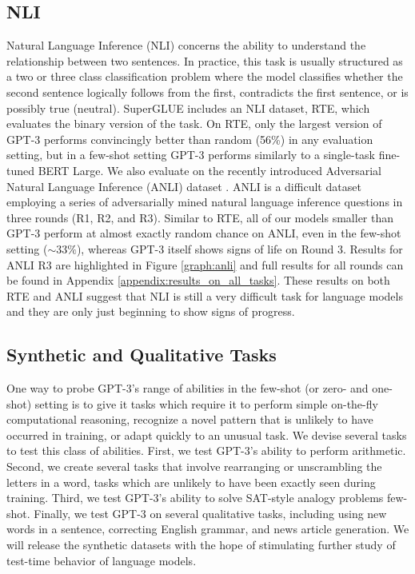 \documentclass{article}
\begin{document}
    \subsection{NLI}
    \label{section:ANLI}
Natural Language Inference (NLI) \cite{fyodorov2000natural} concerns the ability to understand the relationship between two sentences. In practice, this task is usually structured as a two or three class classification problem where the model classifies whether the second sentence logically follows from the first, contradicts the first sentence, or is possibly true (neutral). SuperGLUE includes an NLI dataset, RTE, which evaluates the binary version of the task. On RTE, only the largest version of GPT-3 performs convincingly better than random (56\%) in any evaluation setting, but in a few-shot setting GPT-3 performs similarly to a single-task fine-tuned BERT Large. We also evaluate on the recently introduced Adversarial Natural Language Inference (ANLI) dataset \cite{nie2019adversarial}. ANLI is a difficult dataset employing a series of adversarially mined natural language inference questions in three rounds (R1, R2, and R3). Similar to RTE, all of our models smaller than GPT-3 perform at almost exactly random chance on ANLI, even in the few-shot setting ($\sim33\%$), whereas GPT-3 itself shows signs of life on Round 3. Results for ANLI R3 are highlighted in Figure \ref{graph:anli} and full results for all rounds can be found in Appendix \ref{appendix:results_on_all_tasks}. These results on both RTE and ANLI suggest that NLI is still a very difficult task for language models and they are only just beginning to show signs of progress.

    \subsection{Synthetic and Qualitative Tasks}
    \label{section:Synthetic_and_Qualitative_Tasks}

One way to probe GPT-3’s range of abilities in the few-shot (or zero- and one-shot) setting is to give it tasks which require it to perform simple on-the-fly computational reasoning, recognize a novel pattern that is unlikely to have occurred in training, or adapt quickly to an unusual task.  We devise several tasks to test this class of abilities.  First, we test GPT-3’s ability to perform arithmetic.  Second, we create several tasks that involve rearranging or unscrambling the letters in a word, tasks which are unlikely to have been exactly seen during training.  Third, we test GPT-3’s ability to solve SAT-style analogy problems few-shot.  Finally, we test GPT-3 on several qualitative tasks, including using new words in a sentence, correcting English grammar, and news article generation.  We will release the synthetic datasets with the hope of stimulating further study of test-time behavior of language models.
    
\end{document}
